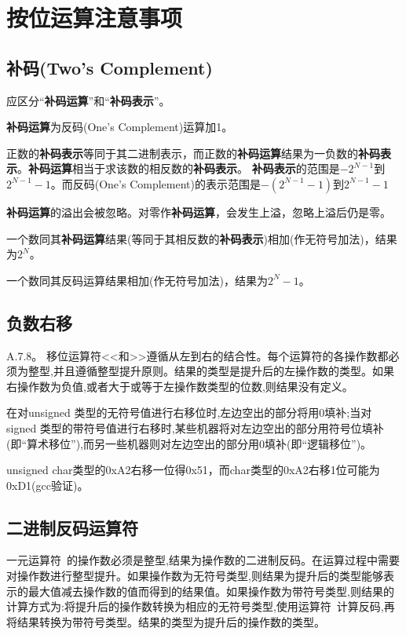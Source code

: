 \section{按位运算注意事项}
\subsection{补码(Two's Complement)}
应区分“\textbf{补码运算}”和“\textbf{补码表示}”。

\textbf{补码运算}为反码(One's Complement)运算加1。

正数的\textbf{补码表示}等同于其二进制表示，而正数的\textbf{补码运算}结果为一负数的\textbf{补码表示}。\textbf{补码运算}相当于求该数的相反数的\textbf{补码表示}。
\textbf{补码表示}的范围是$-2^{N-1}$到$2^{N-1}-1$。而反码(One's Complement)的表示范围是$-(2^{N-1}-1)$到$2^{N-1}-1$

\textbf{补码运算}的溢出会被忽略。对零作\textbf{补码运算}，会发生上溢，忽略上溢后仍是零。

一个数同其\textbf{补码运算}结果(等同于其相反数的\textbf{补码表示})相加(作无符号加法)，结果为$2^N$。

一个数同其反码运算结果相加(作无符号加法)，结果为$2^N-1$。


\subsection{负数右移}
\cite{krc}A.7.8。
移位运算符<<和>>遵循从左到右的结合性。每个运算符的各操作数都必须为整型,并且遵循整型提升原则。结果的类型是提升后的左操作数的类型。如果右操作数为负值,或者大于或等于左操作数类型的位数,则结果没有定义。

在对unsigned 类型的无符号值进行右移位时,左边空出的部分将用0填补;当对 signed 类型的带符号值进行右移时,某些机器将对左边空出的部分用符号位填补(即“算术移位”),而另一些机器则对左边空出的部分用0填补(即“逻辑移位”)。 

unsigned char类型的0xA2右移一位得0x51，而char类型的0xA2右移1位可能为0xD1(gcc验证)。

\subsection{二进制反码运算符}
一元运算符~的操作数必须是整型,结果为操作数的二进制反码。在运算过程中需要对操作数进行整型提升。如果操作数为无符号类型,则结果为提升后的类型能够表示的最大值减去操作数的值而得到的结果值。如果操作数为带符号类型,则结果的计算方式为:将提升后的操作数转换为相应的无符号类型,使用运算符~计算反码,再将结果转换为带符号类型。结果的类型为提升后的操作数的类型。

